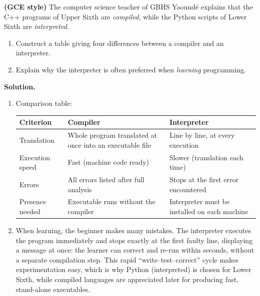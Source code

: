 \documentclass[11pt]{article}
\begin{document}
\begin{exoresolu}
\textbf{(GCE style)} The computer science teacher of GBHS Yaoundé explains that the C++ programs of Upper Sixth are \emph{compiled}, while the Python scripts of Lower Sixth are \emph{interpreted}.
\begin{enumerate}
\item Construct a table giving four differences between a compiler and an interpreter.
\item Explain why the interpreter is often preferred when \emph{learning} programming.
\end{enumerate}
\tcblower
\textbf{Solution.}
\begin{enumerate}
\item Comparison table:
\begin{center}
\begin{tabularx}{\linewidth}{|l|X|X|}
\hline
\rowcolor{popblueL} \textbf{Criterion} & \textbf{Compiler} & \textbf{Interpreter} \\
\hline
Translation & Whole program translated at once into an executable file & Line by line, at every execution \\
\hline
Execution speed & Fast (machine code ready) & Slower (translation each time) \\
\hline
Errors & All errors listed after full analysis & Stops at the first error encountered \\
\hline
Presence needed & Executable runs without the compiler & Interpreter must be installed on each machine \\
\hline
\end{tabularx}
\end{center}
\item When learning, the beginner makes many mistakes. The interpreter executes the program immediately and stops exactly at the first faulty line, displaying a message at once: the learner can correct and re-run within seconds, without a separate compilation step. This rapid ``write--test--correct'' cycle makes experimentation easy, which is why Python (interpreted) is chosen for Lower Sixth, while compiled languages are appreciated later for producing fast, stand-alone executables.
\end{enumerate}
\end{exoresolu}
\end{document}
